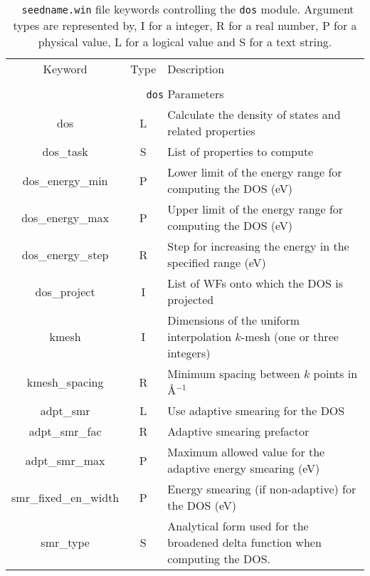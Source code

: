 \begin{table}[hH!]
\begin{center}
\begin{tabular}{|c|c|p{6cm}|}
  \hline
  Keyword & Type & Description \\
  &      &             \\
  \hline\hline
  \multicolumn{3}{|c|}{{\tt dos} Parameters} \\
  \hline
  {\sc dos}  & L & Calculate the density of states and related properties\\
  {\sc dos\_task}& S  & List of properties to compute \\
  {\sc dos\_energy\_min} & P & Lower limit of the energy range for
  computing the DOS (eV)\\
  {\sc dos\_energy\_max}& P & Upper limit of the energy range for
  computing the DOS (eV)\\
  {\sc dos\_energy\_step}& R & Step for increasing the energy in the specified range (eV)\\
  {\sc dos\_project}& I & List of WFs onto which the DOS is projected\\
  {\sc [dos\_]kmesh} & I & Dimensions of the uniform interpolation $k$-mesh (one or three integers)\\ 
  {\sc [dos\_]kmesh\_spacing}& R & Minimum spacing between $k$ points in \AA$^{-1}$\\
  {\sc [dos\_]adpt\_smr} & L & Use adaptive smearing for the DOS \\
  {\sc [dos\_]adpt\_smr\_fac} & R & Adaptive smearing prefactor\\
  {\sc [dos\_]adpt\_smr\_max} & P & Maximum allowed value for the adaptive energy smearing (eV) \\
  {\sc [dos\_]smr\_fixed\_en\_width} & P  & Energy smearing (if non-adaptive) for the DOS (eV) \\   
  {\sc [dos\_]smr\_type} & S & Analytical form used for the broadened delta function
  when computing the DOS. \\
  \hline
\end{tabular}
\caption[Parameter file keywords controlling the DOS module.]  {{\tt
    seedname.win} file keywords controlling the {\tt dos}
  module. Argument types are represented by, I for a integer, R for a
  real number, P for a physical value, L for a logical value and S for
  a text string.}
\label{parameter_keywords_dos}
\end{center}
\end{table}


